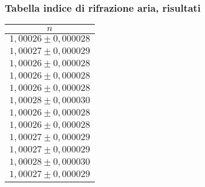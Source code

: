 \subsubsection{Tabella indice di rifrazione aria, risultati}
    \begin{table}[H]
    \centering
        \begin{tabular}{|c|}
        \hline
        $ n $ \\
        \hline
        $ 1,00026 \pm 0,000028 $ \\
        \hline
        $ 1,00027 \pm 0,000029 $ \\
        \hline
        $ 1,00026 \pm 0,000028 $ \\
        \hline
        $ 1,00026 \pm 0,000028 $ \\
        \hline
        $ 1,00026 \pm 0,000028 $ \\
        \hline
        $ 1,00028 \pm 0,000030 $ \\
        \hline
        $ 1,00026 \pm 0,000028 $ \\
        \hline
        $ 1,00026 \pm 0,000028 $ \\
        \hline
        $ 1,00027 \pm 0,000029 $ \\
        \hline
        $ 1,00027 \pm 0,000029 $ \\
        \hline
        $ 1,00028 \pm 0,000030 $ \\
        \hline
        $ 1,00027 \pm 0,000029 $ \\
        \hline
        \end{tabular}
    \end{table}